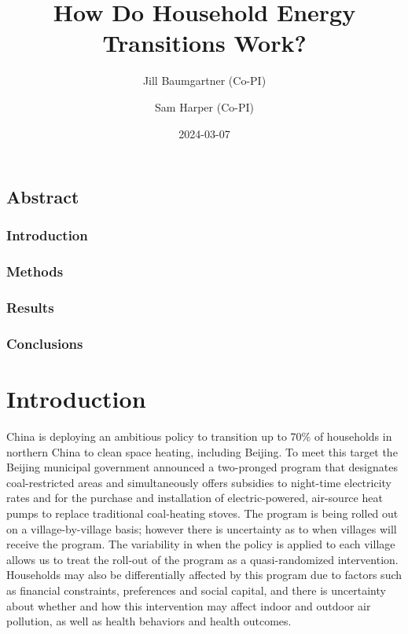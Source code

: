 \documentclass[
  letterpaper,
  DIV=11,
  numbers=noendperiod]{scrartcl}
\title{How Do Household Energy Transitions Work?}
\author{Jill Baumgartner (Co-PI) \and Sam Harper (Co-PI)}
\date{2024-03-07}
\renewcommand*\contentsname{Table of contents}
\newcommand\contentsname{Table of contents}
\begin{document}
\maketitle
\renewcommand*\contentsname{Table of contents}
{
\hypersetup{linkcolor=}
\setcounter{tocdepth}{3}
\tableofcontents
}
\subsection*{Abstract}\label{abstract}

\subsubsection*{Introduction}\label{introduction}

\subsubsection*{Methods}\label{methods}

\subsubsection*{Results}\label{results}

\subsubsection*{Conclusions}\label{conclusions}

\section{Introduction}\label{introduction-1}

China is deploying an ambitious policy to transition up to 70\% of
households in northern China to clean space heating, including Beijing.
To meet this target the Beijing municipal government announced a
two-pronged program that designates coal-restricted areas and
simultaneously offers subsidies to night-time electricity rates and for
the purchase and installation of electric-powered, air-source heat pumps
to replace traditional coal-heating stoves. The program is being rolled
out on a village-by-village basis; however there is uncertainty as to
when villages will receive the program. The variability in when the
policy is applied to each village allows us to treat the roll-out of the
program as a quasi-randomized intervention. Households may also be
differentially affected by this program due to factors such as financial
constraints, preferences and social capital, and there is uncertainty
about whether and how this intervention may affect indoor and outdoor
air pollution, as well as health behaviors and health outcomes.
\end{document}

